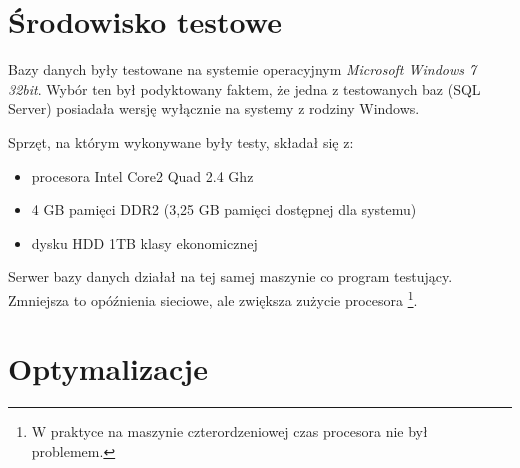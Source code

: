 

\section*{Środowisko testowe}

Bazy danych były testowane na systemie operacyjnym \emph{Microsoft Windows 7 32bit}.
Wybór ten był podyktowany faktem, że jedna z testowanych baz (SQL Server) posiadała wersję wyłącznie na systemy z rodziny Windows.

Sprzęt, na którym wykonywane były testy, składał się z:
\begin{itemize}
  \item procesora Intel Core2 Quad 2.4 Ghz
  \item 4 GB pamięci DDR2 (3,25 GB pamięci dostępnej dla systemu)
  \item dysku HDD 1TB klasy ekonomicznej
\end{itemize}

Serwer bazy danych działał na tej samej maszynie co program testujący.
Zmniejsza to opóźnienia sieciowe, ale zwiększa zużycie procesora%
\footnote{W praktyce na maszynie czterordzeniowej czas procesora nie był problemem.}.

%

\section*{Optymalizacje}

%
%

